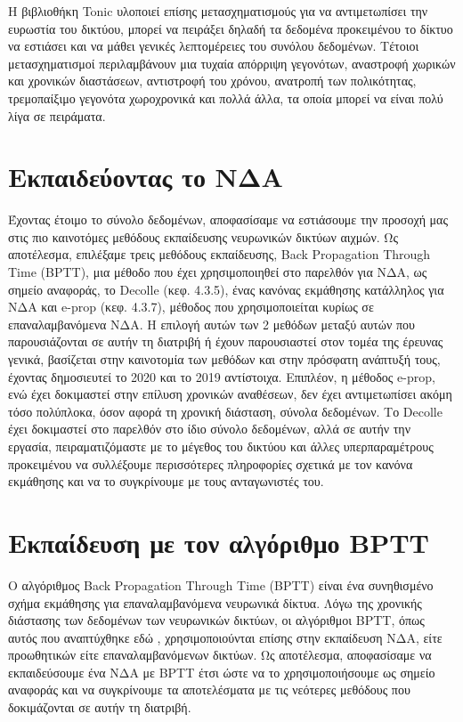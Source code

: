 \documentclass[12pt]{report}
\begin{document}
Η βιβλιοθήκη \textlatin{Tonic} υλοποιεί επίσης μετασχηματισμούς για να αντιμετωπίσει την ευρωστία του δικτύου, μπορεί να πειράξει δηλαδή τα δεδομένα προκειμένου το δίκτυο να εστιάσει και να μάθει γενικές λεπτομέρειες του συνόλου δεδομένων. Τέτοιοι μετασχηματισμοί περιλαμβάνουν μια τυχαία απόρριψη γεγονότων, αναστροφή χωρικών και χρονικών διαστάσεων, αντιστροφή του χρόνου, ανατροπή των πολικότητας, τρεμοπαίξιμο γεγονότα χωροχρονικά και πολλά άλλα, τα οποία μπορεί να είναι πολύ λίγα σε πειράματα.

\section{Εκπαιδεύοντας το ΝΔΑ}

Έχοντας έτοιμο το σύνολο δεδομένων, αποφασίσαμε να εστιάσουμε την προσοχή μας στις πιο καινοτόμες μεθόδους εκπαίδευσης νευρωνικών δικτύων αιχμών. Ως αποτέλεσμα, επιλέξαμε τρεις μεθόδους εκπαίδευσης, \textlatin{Back Propagation Through Time (BPTT)}, μια μέθοδο που έχει χρησιμοποιηθεί στο παρελθόν για ΝΔΑ, ως σημείο αναφοράς, το \textlatin{Decolle} (κεφ. 4.3.5), ένας κανόνας εκμάθησης κατάλληλος για ΝΔΑ και \textlatin{e-prop} (κεφ. 4.3.7), μέθοδος που χρησιμοποιείται κυρίως σε επαναλαμβανόμενα ΝΔΑ. Η επιλογή αυτών των 2 μεθόδων μεταξύ αυτών που παρουσιάζονται σε αυτήν τη διατριβή ή έχουν παρουσιαστεί στον τομέα της έρευνας γενικά, βασίζεται στην καινοτομία των μεθόδων και στην πρόσφατη ανάπτυξή τους, έχοντας δημοσιευτεί το 2020 και το 2019 αντίστοιχα. Επιπλέον, η μέθοδος \textlatin{e-prop}, ενώ έχει δοκιμαστεί στην επίλυση χρονικών αναθέσεων, δεν έχει αντιμετωπίσει ακόμη τόσο πολύπλοκα, όσον αφορά τη χρονική διάσταση, σύνολα δεδομένων. Το \textlatin{Decolle} έχει δοκιμαστεί στο παρελθόν στο ίδιο σύνολο δεδομένων, αλλά σε αυτήν την εργασία, πειραματιζόμαστε με το μέγεθος του δικτύου και άλλες υπερπαραμέτρους προκειμένου να συλλέξουμε περισσότερες πληροφορίες σχετικά με τον κανόνα εκμάθησης και να το συγκρίνουμε με τους ανταγωνιστές του.

\section{Εκπαίδευση με τον αλγόριθμο \textlatin{BPTT}}

Ο αλγόριθμος \textlatin{Back Propagation Through Time (BPTT)} είναι ένα συνηθισμένο σχήμα εκμάθησης για επαναλαμβανόμενα νευρωνικά δίκτυα. Λόγω της χρονικής διάστασης των δεδομένων των νευρωνικών δικτύων, οι αλγόριθμοι \textlatin{BPTT}, όπως αυτός που αναπτύχθηκε εδώ \cite{Wu2018}, χρησιμοποιούνται επίσης στην εκπαίδευση ΝΔΑ, είτε προωθητικών είτε επαναλαμβανόμενων δικτύων. Ως αποτέλεσμα, αποφασίσαμε να εκπαιδεύσουμε ένα ΝΔΑ με \textlatin{BPTT} έτσι ώστε να το χρησιμοποιήσουμε ως σημείο αναφοράς και να συγκρίνουμε τα αποτελέσματα με τις νεότερες μεθόδους που δοκιμάζονται σε αυτήν τη διατριβή.
\end{document}
